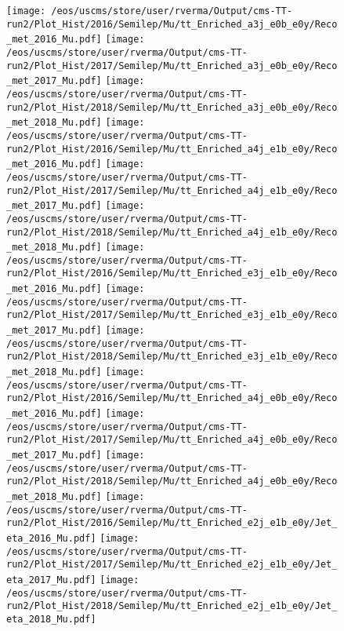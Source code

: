 \begin{figure}
\centering
\texttt{[image: /eos/uscms/store/user/rverma/Output/cms-TT-run2/Plot\_Hist/2016/Semilep/Mu/tt\_Enriched\_a3j\_e0b\_e0y/Reco\_met\_2016\_Mu.pdf]}
\texttt{[image: /eos/uscms/store/user/rverma/Output/cms-TT-run2/Plot\_Hist/2017/Semilep/Mu/tt\_Enriched\_a3j\_e0b\_e0y/Reco\_met\_2017\_Mu.pdf]}
\texttt{[image: /eos/uscms/store/user/rverma/Output/cms-TT-run2/Plot\_Hist/2018/Semilep/Mu/tt\_Enriched\_a3j\_e0b\_e0y/Reco\_met\_2018\_Mu.pdf]}
\texttt{[image: /eos/uscms/store/user/rverma/Output/cms-TT-run2/Plot\_Hist/2016/Semilep/Mu/tt\_Enriched\_a4j\_e1b\_e0y/Reco\_met\_2016\_Mu.pdf]}
\texttt{[image: /eos/uscms/store/user/rverma/Output/cms-TT-run2/Plot\_Hist/2017/Semilep/Mu/tt\_Enriched\_a4j\_e1b\_e0y/Reco\_met\_2017\_Mu.pdf]}
\texttt{[image: /eos/uscms/store/user/rverma/Output/cms-TT-run2/Plot\_Hist/2018/Semilep/Mu/tt\_Enriched\_a4j\_e1b\_e0y/Reco\_met\_2018\_Mu.pdf]}
\texttt{[image: /eos/uscms/store/user/rverma/Output/cms-TT-run2/Plot\_Hist/2016/Semilep/Mu/tt\_Enriched\_e3j\_e1b\_e0y/Reco\_met\_2016\_Mu.pdf]}
\texttt{[image: /eos/uscms/store/user/rverma/Output/cms-TT-run2/Plot\_Hist/2017/Semilep/Mu/tt\_Enriched\_e3j\_e1b\_e0y/Reco\_met\_2017\_Mu.pdf]}
\texttt{[image: /eos/uscms/store/user/rverma/Output/cms-TT-run2/Plot\_Hist/2018/Semilep/Mu/tt\_Enriched\_e3j\_e1b\_e0y/Reco\_met\_2018\_Mu.pdf]}
\texttt{[image: /eos/uscms/store/user/rverma/Output/cms-TT-run2/Plot\_Hist/2016/Semilep/Mu/tt\_Enriched\_a4j\_e0b\_e0y/Reco\_met\_2016\_Mu.pdf]}
\texttt{[image: /eos/uscms/store/user/rverma/Output/cms-TT-run2/Plot\_Hist/2017/Semilep/Mu/tt\_Enriched\_a4j\_e0b\_e0y/Reco\_met\_2017\_Mu.pdf]}
\texttt{[image: /eos/uscms/store/user/rverma/Output/cms-TT-run2/Plot\_Hist/2018/Semilep/Mu/tt\_Enriched\_a4j\_e0b\_e0y/Reco\_met\_2018\_Mu.pdf]}
\texttt{[image: /eos/uscms/store/user/rverma/Output/cms-TT-run2/Plot\_Hist/2016/Semilep/Mu/tt\_Enriched\_e2j\_e1b\_e0y/Jet\_eta\_2016\_Mu.pdf]}
\texttt{[image: /eos/uscms/store/user/rverma/Output/cms-TT-run2/Plot\_Hist/2017/Semilep/Mu/tt\_Enriched\_e2j\_e1b\_e0y/Jet\_eta\_2017\_Mu.pdf]}
\texttt{[image: /eos/uscms/store/user/rverma/Output/cms-TT-run2/Plot\_Hist/2018/Semilep/Mu/tt\_Enriched\_e2j\_e1b\_e0y/Jet\_eta\_2018\_Mu.pdf]}
\end{figure}

